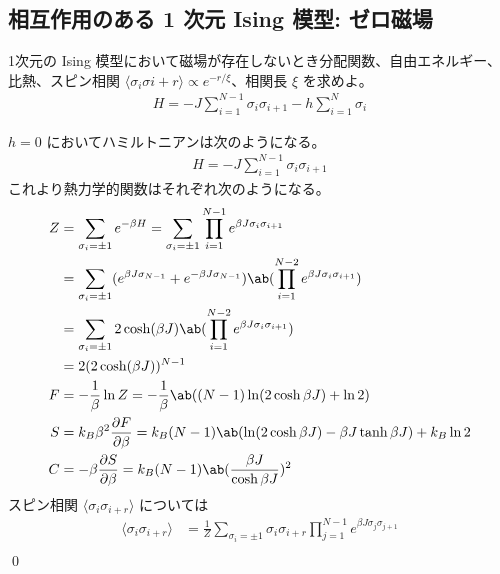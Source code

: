 \documentclass[uplatex,dvipdfmx,a4paper,11pt]{jlreq}
\makeatletter
\numberwithin{equation}{section}
\theoremstyle{definition}
\renewenvironment{proof}[1][\proofname]{\par
  \normalfont
  \topsep6\p@\@plus6\p@ \trivlist
  \item[\hskip\labelsep{\bfseries #1}\@addpunct{\bfseries}]\ignorespaces\quad\par
}{%
  \qed\endtrivlist\@endpefalse
}
\renewcommand\proofname{証明}
\makeatother
\begin{document}
\subsection{相互作用のある 1 次元 Ising 模型: ゼロ磁場}
\begin{problem}
1次元の Ising 模型において磁場が存在しないとき分配関数、自由エネルギー、比熱、スピン相関 $\langle\sigma_i\sigma{i+r}\rangle \propto e^{-r/\xi}$、相関長 $\xi$ を求めよ。
\begin{align}
  H = -J\sum_{i=1}^{N-1}\sigma_i\sigma_{i+1} - h\sum_{i=1}^{N}\sigma_i
\end{align}
\end{problem}
\begin{proof}
  $h = 0$ においてハミルトニアンは次のようになる。
  \begin{align}
    H = -J\sum_{i=1}^{N-1}\sigma_i\sigma_{i+1}
  \end{align}
  これより熱力学的関数はそれぞれ次のようになる。
  \begin{align}
    Z & = \sum_{\sigma_i=\pm 1}e^{-\beta H} = \sum_{\sigma_i=\pm 1}\prod_{i=1}^{N-1}e^{\beta J\sigma_i\sigma_{i+1}}                      \\
      & = \sum_{\sigma_i=\pm 1}(e^{\beta J\sigma_{N-1}} + e^{-\beta J\sigma_{N-1}})\ab(\prod_{i=1}^{N-2}e^{\beta J\sigma_i\sigma_{i+1}}) \\
      & = \sum_{\sigma_i=\pm 1}2\cosh(\beta J)\ab(\prod_{i=1}^{N-2}e^{\beta J\sigma_i\sigma_{i+1}})                                      \\
      & = 2(2\cosh(\beta J))^{N-1}                                                                                                       \\
    F & = -\frac{1}{\beta}\ln Z = -\frac{1}{\beta}\ab((N-1)\ln(2\cosh\beta J) + \ln 2)                                                   \\
    S & = k_B\beta^2\diffp{F}{\beta} = k_B(N-1)\ab(\ln(2\cosh\beta J) - \beta J\tanh\beta J) + k_B\ln 2                                  \\
    C & = -\beta\diffp{S}{\beta} = k_B(N-1)\ab(\frac{\beta J}{\cosh\beta J})^2
  \end{align}
  スピン相関 $\langle\sigma_i\sigma_{i+r}\rangle$ については
  \begin{align}
    \langle\sigma_i\sigma_{i+r}\rangle & = \frac{1}{Z}\sum_{\sigma_i = \pm 1}\sigma_i\sigma_{i + r}\prod_{j=1}^{N-1}e^{\beta J\sigma_j\sigma_{j+1}}                                                                 \\

\end{align}
\end{proof}
\end{document}
